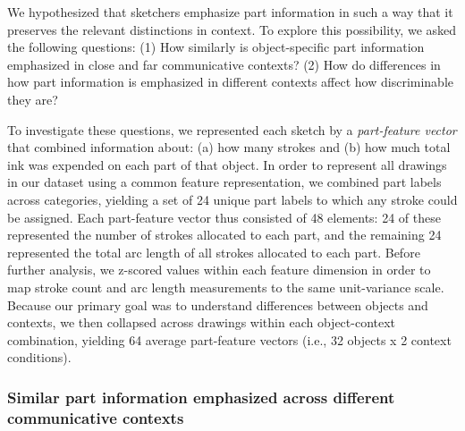 \documentclass[10pt,letterpaper]{article}
\begin{document}
We hypothesized that sketchers emphasize part information in such a way that it preserves the relevant distinctions in context. 
To explore this possibility, we asked the following questions: 
(1) How similarly is object-specific part information emphasized in close and far communicative contexts? 
(2) How do differences in how part information is emphasized in different contexts affect how discriminable they are?

To investigate these questions, we represented each sketch by a \textit{part-feature vector} that combined information about: (a) how many strokes and (b) how much total ink was expended on each part of that object. 
In order to represent all drawings in our dataset using a common feature representation, we combined part labels across categories, yielding a set of 24 unique part labels to which any stroke could be assigned. 
Each part-feature vector thus consisted of 48 elements: 24 of these represented the number of strokes allocated to each part, and the remaining 24 represented the total arc length of all strokes allocated to each part. 
Before further analysis, we z-scored values within each feature dimension in order to map stroke count and arc length measurements to the same unit-variance scale. 
Because our primary goal was to understand differences between objects and contexts, we then collapsed across drawings within each object-context combination, yielding 64 average part-feature vectors (i.e., 32 objects x 2 context conditions). 

\subsubsection{Similar part information emphasized across different communicative contexts}
\end{document}

